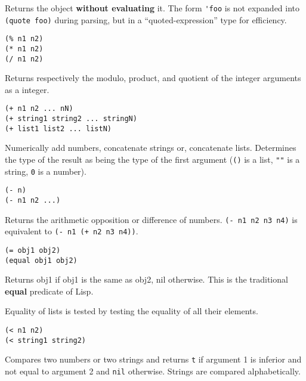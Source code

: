 Returns the object {\bf without evaluating} it. The form \verb"'foo" is
not expanded into \verb"(quote foo)" during parsing, but in a
``quoted-expression'' {\WOOL} type for efficiency.

        
{\usagefont\begin{verbatim}
(% n1 n2)
(* n1 n2)
(/ n1 n2)
\end{verbatim}}\usageupspace

Returns respectively the modulo, product, and quotient of the integer
arguments as a integer.

        
{\usagefont\begin{verbatim}
(+ n1 n2 ... nN)
(+ string1 string2 ... stringN)
(+ list1 list2 ... listN)
\end{verbatim}}\usageupspace

Numerically add numbers, concatenate strings or, concatenate lists.
Determines the type of the result as being the type of the first argument
(\verb"()" is a list, \verb|""| is a string, \verb|0| is a number).

        
{\usagefont\begin{verbatim}
(- n)
(- n1 n2 ...)
\end{verbatim}}\usageupspace

Returns the arithmetic opposition or difference of numbers. 
\verb"(- n1 n2 n3 n4)" is equivalent to \verb"(- n1 (+ n2 n3 n4))".

        
{\usagefont\begin{verbatim}
(= obj1 obj2)
(equal obj1 obj2)
\end{verbatim}}\usageupspace

Returns obj1 if obj1 is the same as obj2, nil otherwise. This is the
traditional {\bf equal} predicate of Lisp.

Equality of lists is tested by testing the equality of all their elements.

        
{\usagefont\begin{verbatim}
(< n1 n2)
(< string1 string2)
\end{verbatim}}\usageupspace

Compares two numbers or two strings and returns \verb"t" if argument 1 is
inferior and not equal to argument 2 and \verb"nil" otherwise. Strings are
compared alphabetically.


